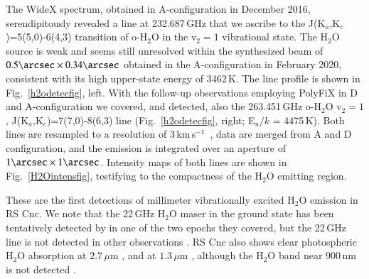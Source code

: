 \documentclass{aa}
\newcommand{\kms}{\,km\,s$^{-1}$~}
\begin{document}
The WideX spectrum, obtained in A-configuration in December 2016,
serendipitously revealed a line at 232.687\,GHz that we ascribe to the
J(K$_a$,K$_c$)=5(5,0)-6(4,3) transition of o-H$_2$O in the v$_2=1$
vibrational state. The H$_2$O source is weak and seems still
unresolved within the synthesized beam of $0.5\arcsec \times
0.34\arcsec$ obtained in the A-configuration in February 2020,
consistent with its high upper-state energy of 3462\,K. The line
profile is shown in Fig.~\ref{h2odetecfig}, left. With the follow-up
observations employing PolyFiX in D and A-configuration we covered,
and detected, also the 263.451\,GHz o-H$_2$O v$_2=1$,
J(K$_a$,K$_c$)=7(7,0)-8(6,3) line (Fig.~\ref{h2odetecfig}, right;
E$_u/k$ = 4475\,K). Both lines are resampled to a resolution of 3\kms,
data are merged from A and D configuration, and the emission is
integrated over an aperture of $1\arcsec \times 1\arcsec$.  Intensity
maps of both lines are shown in Fig.~\ref{H2Ointensfig}, testifying to
the compactness of the H$_2$O emitting region.

These are the first detections of millimeter vibrationally excited
H$_2$O emission in RS Cnc. We note that the 22\,GHz H$_2$O maser in
the ground state has been tentatively detected by
\citet{1995A&A...296..727S} in one of the two epochs they covered, but
the 22\,GHz line is not detected in other observations
\citep{1973ApJ...180..831D,lew97,1995PPMtO..14..185H,2014ApJS..211...15Y}.
RS Cnc also shows clear photospheric H$_2$O absorption at $2.7\,\mu$m
\citep{ms76a,nk93}, and at $1.3\,{\mu}$m
\citep[$7500$\,cm$^{-1}$;][]{jhwdl98}, although the H$_2$O band near
900\,nm is not detected \citep{1966ApJ...143..291S}.
\end{document}
